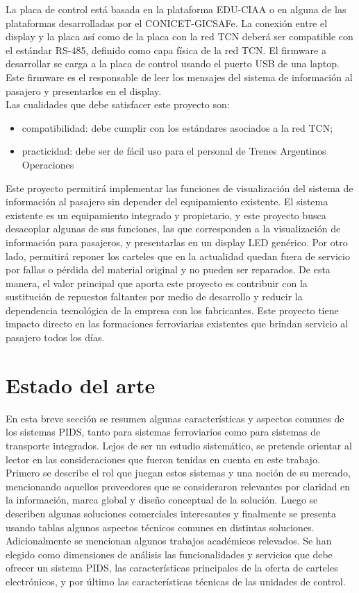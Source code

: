 La placa de control está basada en la plataforma EDU-CIAA \citep{proyecto-ciaa} o en alguna de las plataformas desarrolladas por el CONICET-GICSAFe. La conexión entre el display y la placa así como de la placa con la red TCN deberá ser compatible con el estándar RS-485, definido como capa física de la red TCN. El
firmware a desarrollar se carga a la placa de control usando el puerto USB de una laptop. Este firmware es el responsable de leer los mensajes del sistema de información al pasajero y presentarlos en el display.\\

Las cualidades que debe satisfacer este proyecto son:
\begin{itemize}
\item compatibilidad: debe cumplir con los estándares asociados a la red TCN;
\item practicidad: debe ser de fácil uso para el personal de Trenes Argentinos Operaciones
\end{itemize}

Este proyecto permitirá implementar las funciones de visualización del sistema de información al pasajero sin depender del equipamiento existente. El sistema existente es un equipamiento integrado y propietario, y este proyecto busca desacoplar algunas de sus funciones, las que corresponden a la visualización de información para pasajeros, y presentarlas en un display LED genérico. Por otro lado, permitirá reponer los carteles que en la actualidad quedan fuera de servicio por fallas o pérdida del material original y no pueden ser reparados. De esta manera, el valor principal que aporta este proyecto es contribuir con la sustitución de repuestos faltantes por medio de desarrollo y reducir la dependencia tecnológica de la empresa con los fabricantes. Este proyecto tiene impacto directo en las formaciones ferroviarias existentes que brindan servicio al pasajero todos los días.\\


\pagebreak
\section{Estado del arte}

En esta breve sección se resumen algunas características y aspectos comunes de los sistemas PIDS, tanto para sistemas ferroviarios como para sistemas de transporte integrados. Lejos de ser un estudio sistemático, se pretende orientar al lector en las consideraciones que fueron tenidas en cuenta en este trabajo. Primero se describe el rol que juegan estos sistemas y una noción de su mercado, mencionando aquellos proveedores que se consideraron relevantes por claridad en la información, marca global y diseño conceptual de la solución. Luego se describen algunas soluciones comerciales interesantes y finalmente se presenta usando tablas algunos aspectos técnicos comunes en distintas soluciones. Adicionalmente se mencionan algunos trabajos académicos relevados. Se han elegido como dimensiones de análisis las funcionalidades y servicios que debe ofrecer un sistema PIDS, las características principales de la oferta de carteles electrónicos, y por último las características técnicas de las unidades de control. \\


